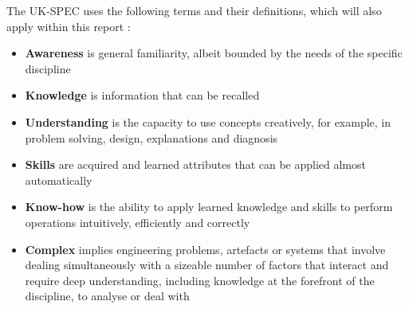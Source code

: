 The UK-SPEC uses the following terms and their definitions, which will also apply within this report \citep{EngineeringCouncil2014}:
\begin{itemize}
    \item \textbf{Awareness} is general familiarity, albeit bounded by the needs of the specific discipline

    \item \textbf{Knowledge} is information that can be recalled

    \item \textbf{Understanding} is the capacity to use concepts creatively, for example, in problem solving, design, explanations and diagnosis

    \item \textbf{Skills} are acquired and learned attributes that can be applied almost automatically

    \item \textbf{Know-how} is the ability to apply learned knowledge and skills to perform operations intuitively, efficiently and correctly

    \item \textbf{Complex} implies engineering problems, artefacts or systems that involve dealing simultaneously with a sizeable number of factors that interact and require deep understanding, including knowledge at the forefront of the discipline, to analyse or deal with

\end{itemize}















